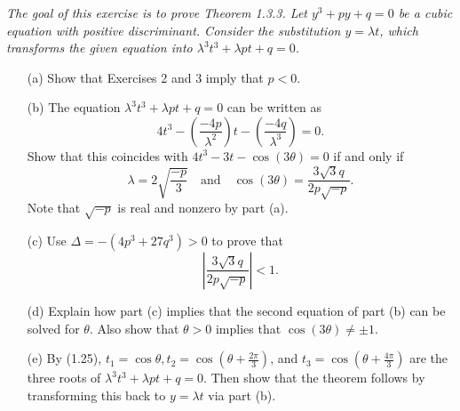 \documentclass[11pt,a4paper]{article}
\begin{document}
{\it 
The goal of this exercise is to prove Theorem 1.3.3. Let $y^3+py+q=0$ be a cubic equation with positive discriminant. Consider the substitution $y = \lambda t$, which transforms the given equation into $\lambda^3 t^3 +\lambda pt+q = 0$.
\begin{enumerate}
\item[(a)] Show that Exercises 2 and 3 imply that $p<0$.
\item[(b)] The equation $\lambda^3 t^3 + \lambda pt + q = 0$ can be written as
$$4t^3 - \left(\frac{-4p}{\lambda^2}\right) t - \left(\frac{-4q}{\lambda^3}\right) = 0.$$
Show that this coincides with $4t^3 - 3t -\cos(3\theta) = 0$ if and only if
$$\lambda = 2 \sqrt{\frac{-p}{3}}\quad \mathrm{and}\quad  \cos(3\theta) = \frac{3\sqrt{3}q}{2p\sqrt{-p}}.$$
Note that $\sqrt{-p}$ is real and nonzero by part (a).
\item[(c)] Use $\Delta = -(4p^3+27q^3) >0$ to prove that
$$\left | \frac{3\sqrt{3}q}{2p\sqrt{-p}} \right | < 1.$$
\item[(d)] Explain how part (c) implies that the second equation of part (b) can be solved for $\theta$. Also show that $\theta>0$ implies that $\cos(3\theta) \neq \pm 1$.
\item[(e)] By (1.25), $t_1 = \cos \theta, t_2 = \cos\left(\theta + \frac{2\pi}{3}\right)$, and $t_3 = \cos\left(\theta + \frac{4\pi}{3}\right)$ are the three roots of $\lambda^3 t^3 + \lambda pt + q = 0$. Then show that the theorem follows by transforming this back to $y=\lambda t$ via part (b).
\end{enumerate}}
\end{document}
